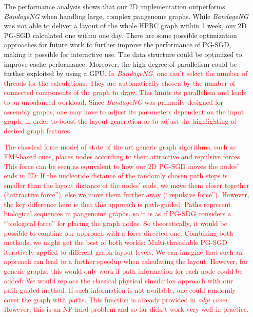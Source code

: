 \documentclass{bioinfo}
\theoremstyle{definition}
\newcommand{\red}[1]{{\textcolor{Red}{#1}}}
\newcommand{\FIXME}[1]{\red{[FIXME: #1]}}
\begin{document}
	The performance analysis shows that our 2D implementation outperforms \textit{BandageNG} when handling large, complex pangenome graphs.
	While \textit{BandageNG} was not able to deliver a layout of the whole HPRC graph within 1 week, our 2D PG-SGD calculated one within one day.
	There are some possible optimization approaches for future work to further improve the performance of PG-SGD, making it possible for interactive use. 
	The data structure could be optimized to improve cache performance. Moreover, the high-degree of parallelism could be further exploited by using a GPU. 
	\red{In \textit{BandageNG}, one can't select the number of threads for the calculations. They are automatically chosen by the number of connected components of the graph to draw. This limits its parallelism and leads to an unbalanced workload. Since \textit{BandageNG} was primarily designed for assembly graphs, one may have to adjust its parameters dependent on the input graph, in order to boost the layout generation or to adjust the highlighting of desired graph features.}
	
	\red{The classical force model of state of the art generic graph algorithms, such as FM³-based ones, places nodes according to their attractive and repulsive forces.
	This force can be seen as equivalent to how our 2D PG-SGD moves the nodes’ ends in 2D: If the nucleotide distance of the randomly chosen path steps is smaller than the layout distance of the nodes' ends, we move them closer together (“attractive force”), else we move them further away (“repulsive force”). 
	However, the key difference here is that this approach is path-guided: Paths represent biological sequences in pangenome graphs, so it is as if PG-SDG considers a “biological force” for placing the graph nodes.
	So theoretically, it would be possible to combine our approach with a force-directed one. 
	Combining both methods, we might get the best of both worlds: Multi-threadable PG-SGD iteratively applied to different graph-layout-levels. 
	We can imagine that such an approach can lead to a further speedup when calculating the layout.
	However, for generic graphs, this would only work if path information for each node could be added: We would replace the classical physical simulation approach with our path-guided method. 
	If such information is not available, one could randomly cover the graph with paths.
	This function is already provided in \textit{odgi cover}. 
	However, this is an NP-hard problem and so far didn't work very well in practice.}
	
\end{document}
